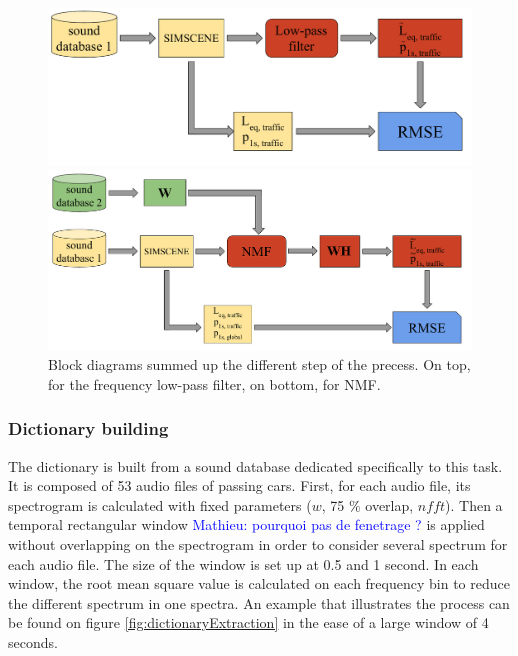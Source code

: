 \documentclass[twocolumn,a4paper,10pt]{article}
\newcommand{\ml}[1]{\textcolor{blue}{ Mathieu: #1}}
\begin{document}
\begin{figure}[!t]
\centering
	\begin{minipage}[t]{.48\textwidth}
		\centering
		\includegraphics[width=.9\linewidth]{../image/bloc_diagram_filtrage_EN.pdf}
	\end{minipage}
	\begin{minipage}[t]{.48\textwidth}
		\centering
		\includegraphics[width=.9\linewidth]{../image/bloc_diagram_NMF_EN.pdf}
	\end{minipage}
	\caption{Block diagrams summed up the different step of the precess. On top, for the frequency low-pass filter, on bottom, for NMF.}
	\label{fig:block_diagram_protocol}
\end{figure}

\subsubsection{Dictionary building}

The dictionary is built from a sound database dedicated specifically to this task. It is composed of 53 audio files of passing cars. First, for each audio file, its spectrogram is calculated with fixed parameters ($w$, 75 $\%$ overlap, $nfft$). Then a temporal rectangular window \ml{pourquoi pas de fenetrage ?} is applied without overlapping on the spectrogram in order to consider several spectrum for each audio file. The size of the window is set up at 0.5 and 1 second. In each window, the root mean square value is calculated on each frequency bin to reduce the different spectrum in one spectra.  An example that illustrates the process can be found on figure \ref{fig:dictionaryExtraction} in the ease of a large window of 4 seconds.
\end{document}
